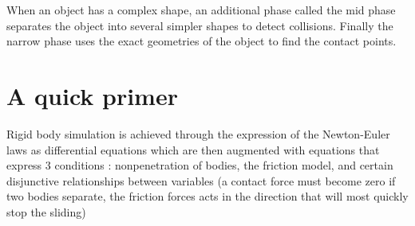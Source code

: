 When an object has a complex shape, an additional phase called the mid phase separates the object into several simpler shapes to detect collisions. Finally the narrow phase uses the exact geometries of the object to find the contact points.

\section{A quick primer}
Rigid body simulation is achieved through the expression of the Newton-Euler laws as differential equations which are then augmented with equations that express 3 conditions : nonpenetration of bodies, the friction model, and certain disjunctive relationships between variables (a contact force must become zero if two bodies separate, the friction forces acts in the direction that will most quickly stop the sliding)
